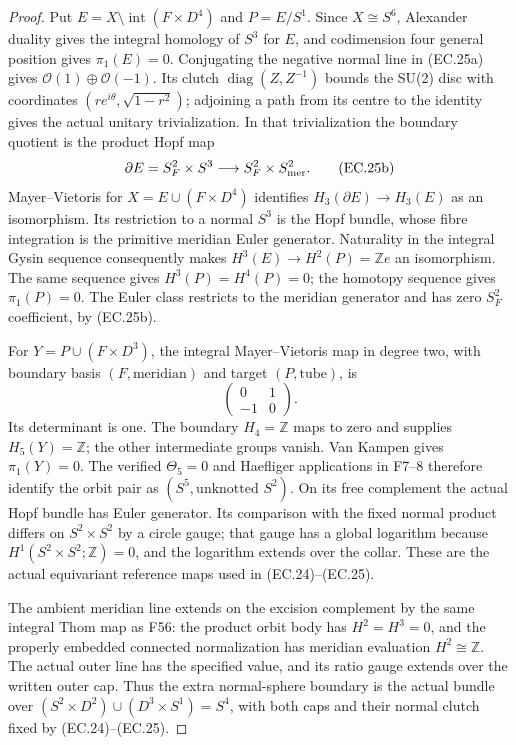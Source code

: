 \begin{proof}
Put \(E=X\setminus\operatorname{int}(F\times D^4)\) and
\(P=E/S^1\). Since \(X\cong S^6\), Alexander duality gives the
integral homology of \(S^3\) for \(E\), and codimension four
general position gives \(\pi_1(E)=0\). Conjugating the negative
normal line in (EC.25a) gives
\(\mathcal O(1)\oplus\mathcal O(-1)\). Its clutch
\(\operatorname{diag}(Z,Z^{-1})\) bounds the SU(2) disc with
coordinates \((r e^{i\theta},\sqrt{1-r^2})\); adjoining a path
from its centre to the identity gives the actual unitary
trivialization. In that trivialization the boundary quotient is
the product Hopf map
\[
 \partial E=S^2_F\times S^3
       \longrightarrow S^2_F\times S^2_{\rm mer}.
 \tag{EC.25b}
\]
Mayer--Vietoris for \(X=E\cup(F\times D^4)\) identifies
\(H_3(\partial E)\to H_3(E)\) as an isomorphism. Its restriction
to a normal \(S^3\) is the Hopf bundle, whose fibre integration
is the primitive meridian Euler generator. Naturality in the
integral Gysin sequence consequently makes
\(H^3(E)\to H^2(P)=\mathbb Z e\) an isomorphism. The same
sequence gives \(H^3(P)=H^4(P)=0\); the homotopy sequence gives
\(\pi_1(P)=0\). The Euler class restricts to the meridian
generator and has zero \(S^2_F\) coefficient, by (EC.25b).

For \(Y=P\cup(F\times D^3)\), the integral Mayer--Vietoris
map in degree two, with boundary basis \((F,\mathrm{meridian})\)
and target \((P,\mathrm{tube})\), is
\[
 \begin{pmatrix}0&1\\-1&0\end{pmatrix}.
 \tag{EC.25c}
\]
Its determinant is one. The boundary \(H_4=\mathbb Z\) maps to
zero and supplies \(H_5(Y)=\mathbb Z\); the other intermediate
groups vanish. Van Kampen gives \(\pi_1(Y)=0\).
The verified \(\Theta_5=0\) and Haefliger applications in F7--8
therefore identify the orbit pair as \((S^5,\text{unknotted }S^2)\).
On its free complement the actual Hopf bundle has Euler
generator. Its comparison with the fixed normal product differs
on \(S^2\times S^2\) by a circle gauge; that gauge has a global
logarithm because \(H^1(S^2\times S^2;\mathbb Z)=0\), and the
logarithm extends over the collar. These are the actual
equivariant reference maps used in (EC.24)--(EC.25).

The ambient meridian line extends on the excision complement by
the same integral Thom map as F56: the product orbit body has
\(H^2=H^3=0\), and the properly embedded connected normalization
has meridian evaluation \(H^2\cong\mathbb Z\). The actual outer
line has the specified value, and its ratio gauge extends over
the written outer cap. Thus the extra normal-sphere boundary is
the actual bundle over
\((S^2\times D^2)\cup(D^3\times S^1)=S^4\), with both caps and
their normal clutch fixed by (EC.24)--(EC.25).


\end{proof}
